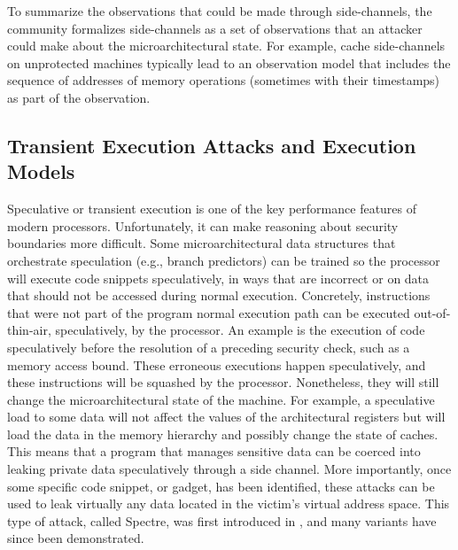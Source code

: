 To summarize the observations that could be made through side-channels, the community formalizes side-channels as a set of observations that an attacker could make about the microarchitectural state. 
For example, cache side-channels on unprotected machines typically lead to an observation model that includes the sequence of addresses of memory operations (sometimes with their timestamps) as part of the observation.

\subsection{Transient Execution Attacks and Execution Models}
\label{sec:specandside}

Speculative or transient execution is one of the key performance features of modern processors.
Unfortunately, it can make reasoning about security boundaries more difficult.
Some microarchitectural data structures that orchestrate speculation (e.g., branch predictors) can be trained so the processor will execute code snippets speculatively, in ways that are incorrect or on data that should not be accessed during normal execution.
Concretely, instructions that were not part of the program normal execution path can be executed out-of-thin-air, speculatively, by the processor.
An example is the execution of code speculatively before the resolution of a preceding security check, such as a memory access bound.
These erroneous executions happen speculatively, and these instructions will be squashed by the processor.
Nonetheless, they will still change the microarchitectural state of the machine.
For example, a speculative load to some data will not affect the values of the architectural registers but will load the data in the memory hierarchy and possibly change the state of caches.
This means that a program that manages sensitive data can be coerced into leaking private data speculatively through a side channel.
More importantly, once some specific code snippet, or gadget, has been identified, these attacks can be used to leak virtually any data located in the victim's virtual address space.
This type of attack, called Spectre, was first introduced in \cite{Kocher2018spectre},  and many variants have since been demonstrated.